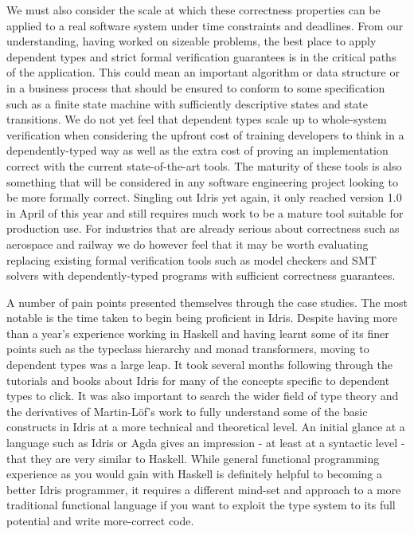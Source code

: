 \documentclass[a4paper, notitlepage]{report}
\begin{document}
We must also consider the scale at which these correctness properties can be
applied to a real software system under time constraints and deadlines. From our
understanding, having worked on sizeable problems, the best place to apply
dependent types and strict formal verification guarantees is in the critical
paths of the application. This could mean an important algorithm or data
structure or in a business process that should be ensured to conform to some
specification such as a finite state machine with sufficiently descriptive
states and state transitions. We do not yet feel that dependent types scale up
to whole-system verification when considering the upfront cost of training
developers to think in a dependently-typed way as well as the extra cost of
proving an implementation correct with the current state-of-the-art tools. The
maturity of these tools is also something that will be considered in any
software engineering project looking to be more formally correct. Singling out
Idris yet again, it only reached version 1.0 in April of this year and still
requires much work to be a mature tool suitable for production use. For
industries that are already serious about correctness such as aerospace and
railway we do however feel that it may be worth evaluating replacing existing
formal verification tools such as model checkers and SMT solvers with
dependently-typed programs with sufficient correctness guarantees.

A number of pain points presented themselves through the case studies. The most
notable is the time taken to begin being proficient in Idris. Despite having
more than a year's experience working in Haskell and having learnt some of its
finer points such as the typeclass hierarchy and monad transformers, moving to
dependent types was a large leap. It took several months following through the
tutorials and books about Idris for many of the concepts specific to dependent
types to click. It was also important to search the wider field of type theory
and the derivatives of Martin-Löf's work to fully understand some of the basic
constructs in Idris at a more technical and theoretical level. An initial glance
at a language such as Idris or Agda gives an impression - at least at a
syntactic level - that they are very similar to Haskell. While general
functional programming experience as you would gain with Haskell is definitely
helpful to becoming a better Idris programmer, it requires a different mind-set
and approach to a more traditional functional language if you want to exploit
the type system to its full potential and write more-correct code.
\end{document}
